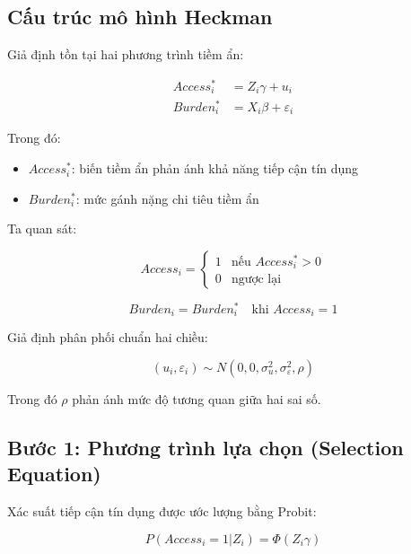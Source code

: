 \documentclass[12pt,a4paper]{report}
\begin{document}
\subsection{Cấu trúc mô hình Heckman}

Giả định tồn tại hai phương trình tiềm ẩn:

\begin{align}
	Access_i^* &= Z_i \gamma + u_i \\
	Burden_i^* &= X_i \beta + \varepsilon_i
\end{align}

Trong đó:

\begin{itemize}
	\item $Access_i^*$: biến tiềm ẩn phản ánh khả năng tiếp cận tín dụng
	\item $Burden_i^*$: mức gánh nặng chi tiêu tiềm ẩn
\end{itemize}

Ta quan sát:

\begin{equation}
	Access_i =
	\begin{cases}
		1 & \text{nếu } Access_i^* > 0 \\
		0 & \text{ngược lại}
	\end{cases}
\end{equation}

\begin{equation}
	Burden_i = Burden_i^* \quad \text{khi } Access_i = 1
\end{equation}

Giả định phân phối chuẩn hai chiều:

\begin{equation}
	(u_i, \varepsilon_i) \sim N(0,0,\sigma_u^2,\sigma_\varepsilon^2,\rho)
\end{equation}

Trong đó $\rho$ phản ánh mức độ tương quan giữa hai sai số.


\subsection{Bước 1: Phương trình lựa chọn (Selection Equation)}

Xác suất tiếp cận tín dụng được ước lượng bằng Probit:

\begin{equation}
	\label{eq:selection}
	P(Access_i = 1 | Z_i) = \Phi(Z_i \gamma)
\end{equation}
\end{document}
